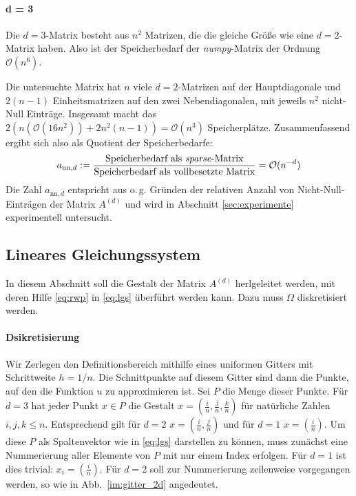 \documentclass[smallheadings]{scrartcl}
\numberwithin{equation}{section}
\begin{document}
 \paragraph{d = 3}
 Die $d=3$-Matrix besteht aus $n^2$ Matrizen, die die gleiche Größe wie eine $d=2$-Matrix haben. Also ist der Speicherbedarf der \textit{numpy}-Matrix der Ordnung $\mathcal{O}(n^6)$.
 
 Die untersuchte Matrix hat $n$ viele $d=2$-Matrizen auf der Hauptdiagonale  und $2(n-1)$ Einheitsmatrizen auf den zwei Nebendiagonalen, mit jeweils $n^2$ nicht-Null Einträge. Insgesamt macht das $2(n(\mathcal{O}(16n^2))+2n^2(n-1))=\mathcal{O}(n^3)$ Speicherplätze. 
Zusammenfassend ergibt sich also als Quotient der Speicherbedarfe:
\begin{align}
a_{\text{nn},d}:=\frac{\text{Speicherbedarf als \textit{sparse}-Matrix}}{\text{Speicherbedarf als vollbesetzte Matrix}}=\mathcal{O}(n^{-d})
\label{eq:quot}
\end{align}
Die Zahl $a_{\text{nn},d}$ entspricht aus o.\,g. Gründen der relativen Anzahl von Nicht-Null-Einträgen der Matrix $A^{(d)}$ und wird in Abschnitt \ref{sec:experimente} experimentell untersucht.

\subsection{Lineares Gleichungssystem}

In diesem Abschnitt soll die Gestalt der Matrix $A^{(d)}$ herlgeleitet werden, mit deren Hilfe \eqref{eq:rwp} in \eqref{eq:lgs} überführt werden kann. Dazu muss $\Omega$ diskretisiert werden.


\paragraph{ Dsikretisierung}

Wir Zerlegen den Definitionsbereich mithilfe eines uniformen Gitters mit Schrittweite $h = 1/n$. Die Schnittpunkte auf diesem Gitter sind dann die Punkte, auf den die Funktion $u$ zu approximieren ist. Sei $P$ die Menge dieser Punkte. Für $d=3$ hat jeder Punkt $x\in P$ die Gestalt $x = (\frac{i}{n}, \frac{j}{n}, \frac{k}{n})$ für natürliche Zahlen $i, j, k \leq n$. Entsprechend gilt für $d=2$ $x=(\frac{i}{n}, \frac{j}{n})$ und für $d=1$ $x=(\frac{i}{n})$.
Um diese $P$ als Spaltenvektor wie in \eqref{eq:lgs} darstellen zu können, muss zunächst eine Nummerierung aller Elemente von $P$ mit nur einem Index erfolgen. Für $d=1$ ist dies trivial: $x_i = (\frac{i}{n})$. 
Für $d=2$ soll zur Nummerierung zeilenweise vorgegangen werden, so wie in Abb.~\ref{im:gitter_2d} angedeutet.
\end{document}
